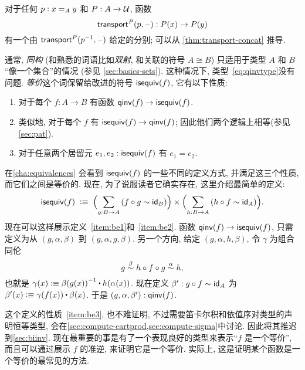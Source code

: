 \begin{eg}
    \label{thm:transportequiv}
    对于任何 $p:\id[A]xy$ 和 $P:A\to\type$, 函数
    \[\transfib{P}{p}{\blank}:P(x) \to P(y)\]
    有一个由 $\transfib{P}{\opp p}{\blank}$ 给定的分别; 可以从 \narrowbreak \cref{thm:transport-concat} 推导.
\end{eg}

通常, \emph{同构}
(和熟悉的词语比如\emph{双射}, 和关联的符号 $A\cong B$)
只适用于类型 $A$ 和 $B$ ``像一个集合''的情况 (参见 \cref{sec:basics-sets}).
这种情况下, 类型~\eqref{eq:qinvtype}没有问题.
\emph{等价}这个词保留给改进的符号 $\isequiv (f)$, 它有以下性质:%
\begin{enumerate}
    \item 对于每个 $f:A\to B$ 有函数 $\qinv(f) \to \isequiv (f)$.\label{item:be1}
    \item 类似地, 对于每个 $f$ 有 $\isequiv (f) \to \qinv(f)$; 因此他们两个逻辑上相等(参见 \cref{sec:pat}).\label{item:be2}
    \item 对于任意两个居留元 $e_1,e_2:\isequiv(f)$ 有 $e_1=e_2$.\label{item:be3}
\end{enumerate}
在\cref{cha:equivalences} 会看到 $\isequiv(f)$ 的一些不同的定义方式, 并满足这三个性质, 而它们之间是等价的.
现在, 为了说服读者它确实存在, 这里介绍最简单的定义:
\begin{equation}
    \label{eq:isequiv-invertible}
    \isequiv(f) \;\defeq\;
    \Parens{\sm{g:B\to A} (f\circ g \htpy \idfunc[B])}
    \times
    \Parens{\sm{h:B\to A} (h\circ f \htpy \idfunc[A])}.
\end{equation}
现在可以这样展示定义~\ref{item:be1}和~\ref{item:be2}.
函数 $\qinv(f) \to \isequiv (f)$, 只需定义为从 $(g,\alpha,\beta)$ 到 $(g,\alpha,g,\beta)$.
另一个方向, 给定 $(g,\alpha,h,\beta)$, 令 $\gamma$ 为组合同伦
\[ g \overset{\beta}{\htpy} h\circ f\circ g \overset{\alpha}{\htpy} h, \]
也就是 $\gamma(x) \defeq \opp{\beta(g(x))} \ct \ap{h}{\alpha(x)}$.
现在定义 $\beta':g\circ f\htpy \idfunc[A]$ 为 $\beta'(x) \defeq \gamma(f(x)) \ct \beta(x)$.
于是 $(g,\alpha,\beta'):\qinv(f)$.

这个定义的性质~\ref{item:be3}, 也不难证明, 不过需要笛卡尔积和依值序对类型的声明恒等类型, 会在\cref{sec:compute-cartprod,sec:compute-sigma}中讨论.
因此将其推迟到\cref{sec:biinv}.
现在最重要的事是有了一个表现良好的类型来表示``$f$ 是一个等价'', 而且可以通过展示 $f$ 的准逆, 来证明它是一个等价.
实际上, 这是证明某个函数是一个等价的最常见的方法.

